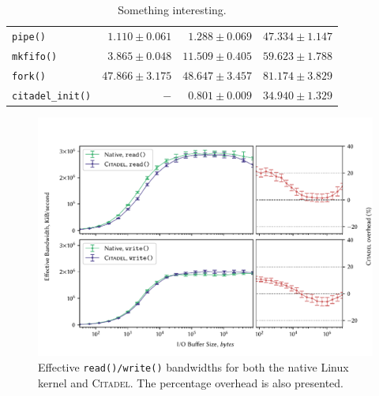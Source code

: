 \begin{table}
\begin{tabular}{l@{\hskip 0.15in} r@{\hskip 0.6in} r@{\hskip 0.35in} r}
        \midrule 
        \texttt{pipe()} & $1.110\pm0.061$ & $1.288\pm0.069$ & $47.334\pm1.147$ \\
        \texttt{mkfifo()} & $3.865\pm0.048$ & $11.509\pm0.405$ & $59.623\pm1.788$ \\

        \midrule 
        \texttt{fork()} & $47.866\pm3.175$ & $48.647\pm3.457$ & $81.174\pm3.829$ \\
        \texttt{citadel\_init()} & $-$ & $0.801\pm0.009$ & $34.940\pm1.329$ \\
        \bottomrule
    \end{tabular}

    \caption{Something interesting.}
\end{table}

\begin{figure}[]
    \centering
    \includegraphics[width=\linewidth]{figures/graphs/io.pdf}
    \vspace{-5mm}
    \caption[Effective \texttt{read()/write()} bandwidths for both the native Linux kernel and \textsc{Citadel}.]{Effective \texttt{read()/write()} bandwidths for both the native Linux kernel and \textsc{Citadel}. The percentage overhead is also presented.}
    \label{fig:io-graph}
\end{figure}


